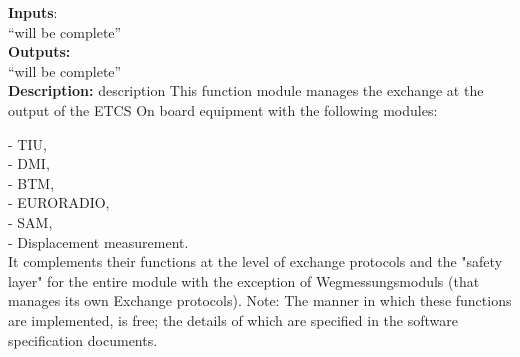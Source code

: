 \documentclass{template/openetcs_report}
\begin{document}
 \textbf{Inputs}:\\
``will be complete''\\
 
 \textbf{Outputs:}\\
 ``will be complete''\\
 
 \textbf{Description:} 
 description 
This function module manages the exchange at the output of the ETCS On board equipment with 
the following modules: 

- TIU, \\
- DMI, \\
- BTM, \\
- EURORADIO,\\ 
- SAM, \\
- Displacement measurement. \\

It complements their functions at the level of exchange protocols and the "safety layer" for 
the entire module with the exception of Wegmessungsmoduls (that manages its own 
Exchange protocols). 
Note: The manner in which these functions are implemented, is free; the 
details of which are specified in the software specification documents.\\
 
\end{document}
